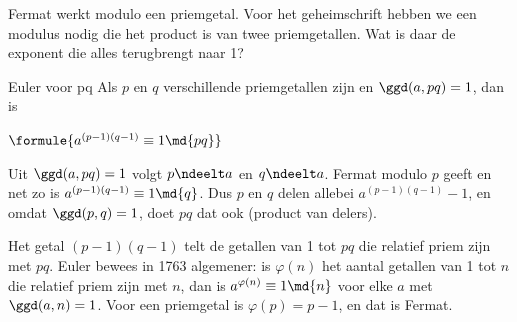 Fermat werkt modulo een priemgetal. Voor het geheimschrift hebben we een modulus nodig die het product is van twee priemgetallen. Wat is daar de exponent die alles terugbrengt naar 1?

\begin{theorie}
\begin{stelling}{Euler voor pq}
Als $p$ en $q$ verschillende priemgetallen zijn en $\ggd(a, pq) = 1$, dan is

\vspace{1mm}
\qquad $\formule{a^{(p - 1)(q - 1)} \equiv 1 \md{pq}}$
\end{stelling}

\begin{bewijs}
Uit $\ggd(a, pq) = 1$ volgt $p \ndeelt a$ en $q \ndeelt a$. Fermat modulo $p$ geeft
en net zo is $a^{(p - 1)(q - 1)} \equiv 1 \md{q}$. Dus $p$ en $q$ delen allebei $a^{(p - 1)(q - 1)} - 1$, en omdat $\ggd(p, q) = 1$, doet $pq$ dat ook (product van delers).
\end{bewijs}
\end{theorie}

Het getal $(p - 1)(q - 1)$ telt de getallen van 1 tot $pq$ die relatief priem zijn met $pq$. Euler bewees in 1763 algemener: is $\varphi(n)$ het aantal getallen van 1 tot $n$ die relatief priem zijn met $n$, dan is $a^{\varphi(n)} \equiv 1 \md{n}$ voor elke $a$ met $\ggd(a, n) = 1$. Voor een priemgetal is $\varphi(p) = p - 1$, en dat is Fermat.



\begin{oefeningen}
\end{oefeningen}

